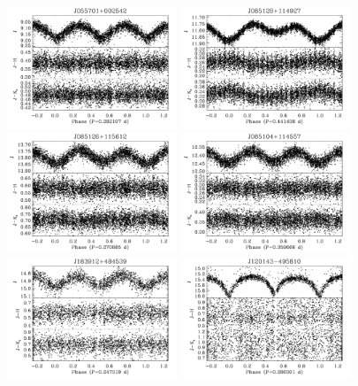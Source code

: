 \documentclass[]{emulateapj}
\begin{document}
\begin{figure}[]
\centering
\includegraphics[width=2.0in]{new_plots/bb1_6}
\includegraphics[width=2.0in]{new_plots/bb1_7}
\includegraphics[width=2.0in]{new_plots/bb1_8}
\includegraphics[width=2.0in]{new_plots/bb1_10}
\includegraphics[width=2.0in]{new_plots/bb1_13}
\includegraphics[width=2.0in]{new_plots/bb1_15}

\end{figure}
\end{document}
